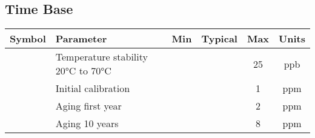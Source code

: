 	\subsection{Time Base}

		\noindent
		\begin{tabularx}{\textwidth}{|c|X|c|c|c|c|}
			\hline
			Symbol & Parameter & Min & Typical & Max & Units\\
			\hline\hline
			 & Temperature stability 20°C to 70°C & & & 25 & ppb \\
			\hline
			 & Initial calibration & & & 1 & ppm \\
			\hline
			 & Aging first year & & & 2 & ppm \\
			\hline
			 & Aging 10 years & & & 8 & ppm \\ 
			\hline
		\end{tabularx}

